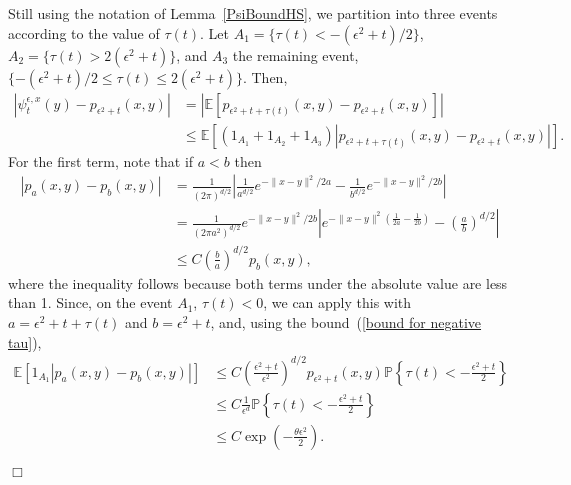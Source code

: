 \documentclass[12pt]{article}
\newenvironment {proof}{{\noindent\bf Proof }}{\hfill $\Box$ \medskip}
\newcommand{\IP}{\mathbb P}
\newcommand{\IE}{\mathbb E}
\numberwithin{equation}{section}
\begin{document}
\begin{proof}
    Still using the notation of Lemma~\ref{PsiBoundHS},
 we partition into three events according to the value of $\tau(t)$.
    Let $A_1 = \{ \tau(t) < - (\epsilon^2 + t)/2 \}$,
    $A_2 = \{ \tau(t) > 2(\epsilon^2 + t) \}$,
    and $A_3$ the remaining event, $\{ - (\epsilon^2 + t)/2 \le \tau(t) \le 2(\epsilon^2 + t) \}$.
    Then,
    \begin{align*}
        \left|
            \psi_t^{\epsilon, x}(y)
            -
            p_{\epsilon^2 + t}(x, y)
        \right|
        &=
        \left|
        \IE\left[
            p_{\epsilon^2 + t + \tau(t)}(x, y)
            -
            p_{\epsilon^2 + t}(x, y)
        \right]
        \right|
        \\&\le
        \IE\left[
            (1_{A_1} + 1_{A_2} + 1_{A_3})
            \left|
            p_{\epsilon^2 + t + \tau(t)}(x, y)
            -
            p_{\epsilon^2 + t}(x, y)
        \right|
        \right] .
    \end{align*}
    For the first term, note that if $a < b$ then
    \begin{align*}
        |p_a(x, y) - p_b(x, y)| 
        &=
        \frac{1}{(2\pi)^{d/2}}
        \left|
            \frac{1}{a^{d/2}}
            e^{-\|x - y\|^2 / 2a}
            -
            \frac{1}{b^{d/2}}
            e^{-\|x - y\|^2 / 2b}
        \right|
        \\ &=
        \frac{1}{(2\pi a^2)^{d/2}}
            e^{-\|x - y\|^2 / 2b}
        \left|
            e^{-\|x - y\|^2 \left(\frac{1}{2a} - \frac{1}{2b}\right)}
            -
            \left(\frac{a}{b}\right)^{d/2}
        \right|
        \\ &\le
        C \left(\frac{b}{a}\right)^{d/2}
        p_b(x, y) ,
    \end{align*}
    where the inequality follows because both terms under the absolute value 
are less than 1.
Since, on the event $A_1$, $\tau(t)<0$, we can  
apply this with $a = \epsilon^2 + t + \tau(t)$ and $b = \epsilon^2 + t$,
and, using the bound~(\ref{bound for negative tau}),
    \begin{align*}
        \IE\left[
            1_{A_1} |p_a(x, y) - p_b(x, y)| 
        \right]
        & \le
            C \left(\frac{\epsilon^2 + t}{\epsilon^2}\right)^{d/2}
            p_{\epsilon^2 + t}(x, y) 
            \IP\left\{ \tau(t) < - \frac{\epsilon^2 + t}{2} \right\}
        \\ & \le
            C \frac{1}{\epsilon^d}
            \IP\left\{ \tau(t) < - \frac{\epsilon^2 + t}{2} \right\}
        \\ & \le
        C \exp\left(-\frac{\theta \epsilon^2}{2} \right) .
    \end{align*}


\end{proof}
\end{document}
